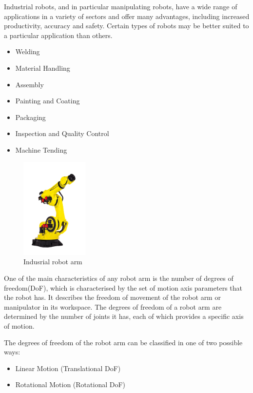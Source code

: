 Industrial robots, and in particular manipulating robots, 
have a wide range of applications in a variety of sectors and 
offer many advantages, including increased productivity, accuracy 
and safety. Certain types of robots may be better suited to a particular 
application than others.
\begin{itemize}[itemsep=0pt]
    \item Welding
    \item Material Handling
    \item Assembly
    \item Painting and Coating
    \item Packaging
    \item Inspection and Quality Control
    \item Machine Tending
\end{itemize}

\begin{figure}[H]
	\centering
	\includegraphics[width=0.3\textwidth]{Src/images/Robot.jpg}
	\caption{Indusrial robot arm}
\end{figure}

One of the main characteristics of any robot arm is the number of degrees of freedom(DoF), which is characterised by the set of motion axis parameters that the robot has.  It describes the freedom of movement of the robot arm or manipulator in its workspace.  The degrees of freedom of a robot arm are determined by the number of joints it has, each of which provides a specific axis of motion.

The degrees of freedom of the robot arm can be classified in one of two possible ways:
\begin{itemize}
    \item Linear Motion (Translational DoF)
    \item Rotational Motion (Rotational DoF)
\end{itemize}

